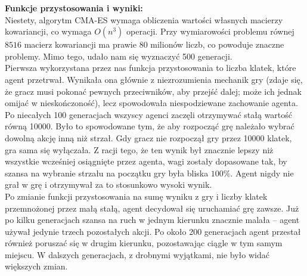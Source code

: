 \documentclass[polish]{article}
\begin{document}
\begin{roboto}
    \noindent \textbf{Funkcje przystosowania i wyniki:}\\
    Niestety, algorytm CMA-ES wymaga obliczenia wartości własnych macierzy kowariancji, co wymaga $O(n^3)$ 
    operacji. Przy wymiarowości problemu równej $8516$ macierz kowariancji ma prawie $80$ milionów liczb,
    co powoduje znaczne problemy. Mimo tego, udało nam się wyznaczyć 500 generacji. \\

    \noindent Pierwsza wykorzystana przez nas funkcja przystosowania to liczba klatek, które agent
    przetrwał. Wynikała ona głównie z niezrozumienia mechanik gry (zdaje się, że gracz musi pokonać
    pewnych przeciwników, aby przejść dalej; może ich jednak omijać w nieskończoność), lecz spowodowała
    niespodziewane zachowanie agenta. Po niecałych 100 generacjach wszyscy agenci zaczęli otrzymywać stałą wartość
    równą 10000. Było to spowodowane tym, że aby rozpocząć grę należało wybrać dowolną akcję inną niż strzał.
    Gdy gracz nie rozpoczął gry przez 10000 klatek, gra sama się wyłączała. Z racji tego, że ten wynik był
    znacznie lepszy niż wszystkie wcześniej osiągnięte przez agenta, wagi zostały dopasowane tak, by szansa
    na wybranie strzału na początku gry była bliska $100\%$. Agent nigdy nie grał w grę i otrzymywał za to
    stosunkowo wysoki wynik.\\

    \noindent Po zmianie funkcji przystosowania na sumę wyniku z gry i liczby klatek przemnożonej przez małą stałą,
    agent decydował się uruchamiać grę zawsze. Już po kilku generacjach szansa na ruch w jednym kierunku znacznie
    malała -- agent używał jedynie trzech pozostałych akcji. Po około 200 generacjach agent przestał
    również poruszać się w drugim kierunku, pozostawając ciągle w tym samym miejscu. W dalszych generacjach,
    z drobnymi wyjątkami, nie było widać większych zmian.

    \end{roboto}
\end{document}
